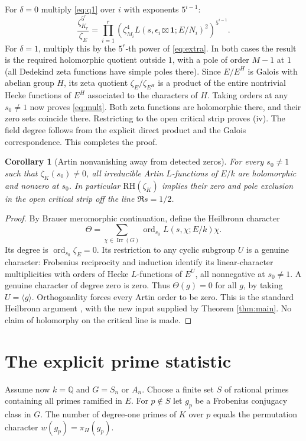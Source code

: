 \documentclass[11pt]{article}
\newtheorem{corollary}[theorem]{Corollary}
\theoremstyle{remark}\newtheorem{remark}[theorem]{Remark}
\newcommand{\ord}{\operatorname{ord}}
\newcommand{\RH}{\mathrm{RH}}
\newcommand{\one}{\mathbf{1}}
\newcommand{\Q}{\mathbb Q}
\begin{document}
For $\delta=0$ multiply \eqref{eq:q1} over $i$ with exponents $5^{i-1}$:
\begin{equation}\label{eq:tel}
 \frac{\zeta_{K_r}^{5^r}}{\zeta_E}=
 \prod_{i=1}^r\left(\zeta_{M_i}^4L(s,\epsilon_i\boxtimes\one;E/N_i)^2\right)^{5^{i-1}}.
\end{equation}
For $\delta=1$, multiply this by the $5^r$-th power of \eqref{eq:extra}.
In both cases the result is the required holomorphic quotient outside $1$,
with a pole of order $M-1$ at $1$ (all Dedekind zeta functions have simple
poles there). Since $E/E^H$ is Galois with abelian group $H$, its zeta quotient
$\zeta_E/\zeta_{E^H}$ is a product of the entire nontrivial Hecke functions
of $E^H$ associated to the characters of $H$. Taking orders at any $s_0\ne1$
now proves \eqref{eq:mult}. Both zeta functions are holomorphic there, and their
zero sets coincide there. Restricting to the open critical strip proves (iv).
The field degree follows from the explicit direct product and the Galois
correspondence. This completes the proof.

\begin{corollary}[Artin nonvanishing away from detected zeros]\label{cor:artin}
For every $s_0\ne1$ such that $\zeta_K(s_0)\ne0$, all irreducible Artin
$L$-functions of $E/k$ are holomorphic and nonzero at $s_0$. In particular
$\RH(\zeta_K)$ implies their zero and pole exclusion in the open critical strip
off the line $\Re s=1/2$.
\end{corollary}
\begin{proof}
By Brauer meromorphic continuation, define the Heilbronn character
\[\Theta=\sum_{\chi\in\operatorname{Irr}(G)}\ord_{s_0}L(s,\chi;E/k)\chi.\]
Its degree is $\ord_{s_0}\zeta_E=0$. Its restriction to any cyclic subgroup
$U$ is a genuine character: Frobenius reciprocity and induction identify
its linear-character multiplicities with orders of Hecke $L$-functions
of $E^U$, all nonnegative at $s_0\ne1$. A genuine character of degree zero
is zero. Thus $\Theta(g)=0$ for all $g$, by taking $U=\langle g\rangle$.
Orthogonality forces every Artin order to be zero. This is the standard
Heilbronn argument \cite{fgm}, with the new input supplied by Theorem
\ref{thm:main}. No claim of holomorphy on the critical line is made.
\end{proof}

\section{The explicit prime statistic}
Assume now $k=\Q$ and $G=S_n$ or $A_n$. Choose a finite set $S$ of rational
primes containing all primes ramified in $E$. For $p\notin S$ let $g_p$ be a
Frobenius conjugacy class in $G$. The number of degree-one primes of $K$
over $p$ equals the permutation character $w(g_p)=\pi_H(g_p)$.
\end{document}
